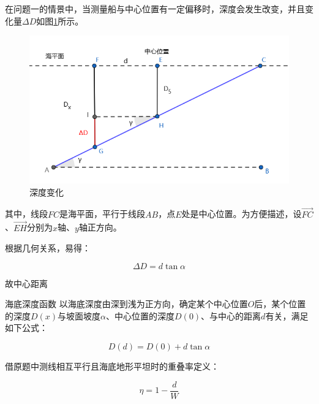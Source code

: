 在问题一的情景中，当测量船与中心位置有一定偏移时，深度会发生改变，并且变化量$\Delta D$如图\ref{fig:深度变化}所示。



\begin{figure}[h]
    \centering
    \includegraphics[scale=0.5]{res/img/深度变化.png}
    \caption{深度变化}
    \label{fig:深度变化}
\end{figure}

其中，线段$FC$是海平面，平行于线段$AB$，点$E$处是中心位置。为方便描述，设$\overrightarrow{FC}$、$\overrightarrow{EH}$分别为$x$轴、$y$轴正方向。

根据几何关系，易得：

\begin{equation}
    \Delta D = d\tan\alpha
\end{equation}

故中心距离\newline\newline\newline\newline

\begin{mcmTheorem}{海底深度函数}
    以海底深度由深到浅为正方向，确定某个中心位置$O$后，某个位置的深度$D(x)$与坡面坡度$\alpha$、中心位置的深度$D(0)$、与中心的距离$d$有关，满足如下公式：

    \begin{equation}
        D(d) = D(0) + d\tan\alpha
    \end{equation}
\end{mcmTheorem}

借原题中测线相互平行且海底地形平坦时的重叠率定义：

\begin{equation}
    \eta = 1 - \frac{d}{W}
\end{equation}

